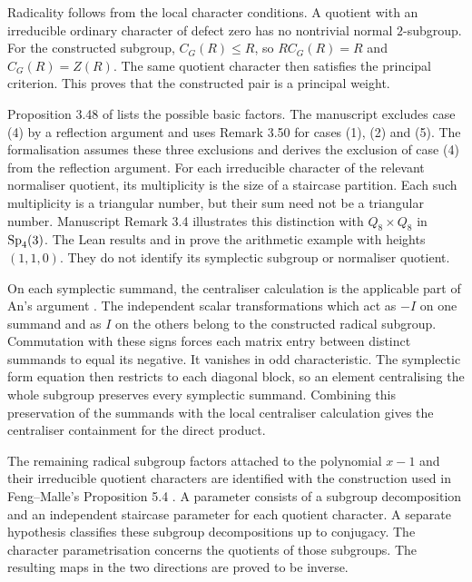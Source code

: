 Radicality follows from the local character conditions. A quotient with an
irreducible ordinary character of defect zero has no nontrivial normal
$2$-subgroup.
For the constructed subgroup,
$C_G(R)\leq R$, so $RC_G(R)=R$ and $C_G(R)=Z(R)$. The same quotient
character then satisfies the principal criterion. This proves that the
constructed pair is a principal weight.

Proposition 3.48 of \cite{FengYuZhang2024} lists the possible basic
factors. The manuscript excludes case (4) by a reflection argument
and uses Remark 3.50 for cases (1), (2) and (5).
The formalisation assumes these three exclusions and derives the
exclusion of case (4) from the reflection argument.
For each irreducible character of the relevant normaliser quotient,
its multiplicity is the size of a staircase partition.
Each such multiplicity is a triangular number, but their sum need
not be a triangular number.
Manuscript Remark 3.4 illustrates this distinction with
$Q_8\times Q_8$ in $\operatorname{Sp}_4(3)$. The Lean results
 and  in
prove the arithmetic example with heights $(1,1,0)$. They do not
identify its symplectic subgroup or normaliser quotient.

On each symplectic summand, the centraliser calculation is the applicable
part of An's argument \cite[p.~198]{An1993}. The independent scalar
transformations which act as $-I$ on one summand and as $I$ on the others
belong to the constructed radical subgroup. Commutation with these signs
forces each matrix entry between distinct summands to equal its negative. It
vanishes in odd characteristic. The symplectic form equation then restricts
to each diagonal block, so an element centralising the whole subgroup
preserves every symplectic summand. Combining this preservation of the
summands with the local centraliser calculation gives the centraliser
containment for the direct product.

The remaining radical subgroup factors attached to the polynomial $x-1$
and their irreducible quotient characters are identified with the
construction used in Feng--Malle's Proposition 5.4
\cite{FengMalle2022}. A parameter consists of a subgroup decomposition
and an independent staircase parameter for each quotient character. A
separate hypothesis classifies these subgroup decompositions up to
conjugacy. The character parametrisation concerns the quotients of those
subgroups. The resulting maps in the two directions are proved to be inverse.

